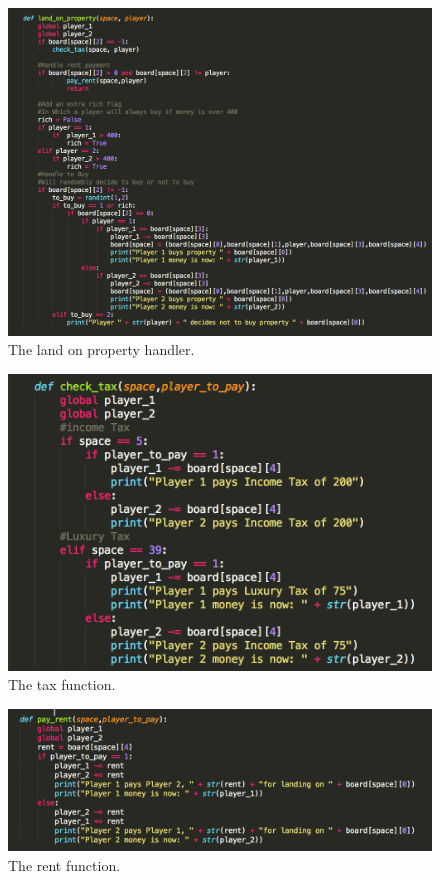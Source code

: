 \documentclass[12pt, letter]{article}
\begin{document}
 \begin{figure}[htb]
  \centering
  \includegraphics[width=0.9 \textwidth]{./figures/land_on.png}
  \caption{The land on property handler.}
\end{figure}

 \begin{figure}[htb]
  \centering
  \includegraphics[width=0.7 \textwidth]{./figures/tax.png}
  \caption{The tax function.}
\end{figure}

 \begin{figure}[htb]
  \centering
  \includegraphics[width=0.8 \textwidth]{./figures/rent.png}
  \caption{The rent function.}
\end{figure}
\end{document}

